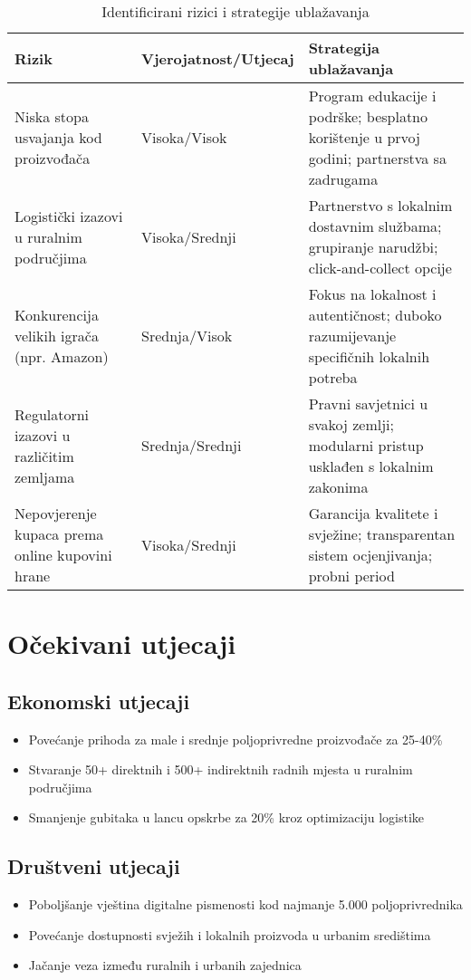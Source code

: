 \documentclass[a4paper,12pt]{article}
\begin{document}
\begin{table}[H]
\centering
\caption{Identificirani rizici i strategije ublažavanja}
\begin{tabularx}{\textwidth}{|l|l|X|}
\hline
\textbf{Rizik} & \textbf{Vjerojatnost/Utjecaj} & \textbf{Strategija ublažavanja} \\
\hline
Niska stopa usvajanja kod proizvođača & Visoka/Visok & Program edukacije i podrške; besplatno korištenje u prvoj godini; partnerstva sa zadrugama \\
\hline
Logistički izazovi u ruralnim područjima & Visoka/Srednji & Partnerstvo s lokalnim dostavnim službama; grupiranje narudžbi; click-and-collect opcije \\
\hline
Konkurencija velikih igrača (npr. Amazon) & Srednja/Visok & Fokus na lokalnost i autentičnost; duboko razumijevanje specifičnih lokalnih potreba \\
\hline
Regulatorni izazovi u različitim zemljama & Srednja/Srednji & Pravni savjetnici u svakoj zemlji; modularni pristup usklađen s lokalnim zakonima \\
\hline
Nepovjerenje kupaca prema online kupovini hrane & Visoka/Srednji & Garancija kvalitete i svježine; transparentan sistem ocjenjivanja; probni period \\
\hline
\end{tabularx}
\end{table}

\section{Očekivani utjecaji}
\label{sec:ocekivani-utjecaji}

\subsection{Ekonomski utjecaji}
\begin{itemize}
    \item Povećanje prihoda za male i srednje poljoprivredne proizvođače za 25-40\%
    \item Stvaranje 50+ direktnih i 500+ indirektnih radnih mjesta u ruralnim područjima
    \item Smanjenje gubitaka u lancu opskrbe za 20\% kroz optimizaciju logistike
\end{itemize}

\subsection{Društveni utjecaji}
\begin{itemize}
    \item Poboljšanje vještina digitalne pismenosti kod najmanje 5.000 poljoprivrednika
    \item Povećanje dostupnosti svježih i lokalnih proizvoda u urbanim središtima
    \item Jačanje veza između ruralnih i urbanih zajednica
\end{itemize}
\end{document}
